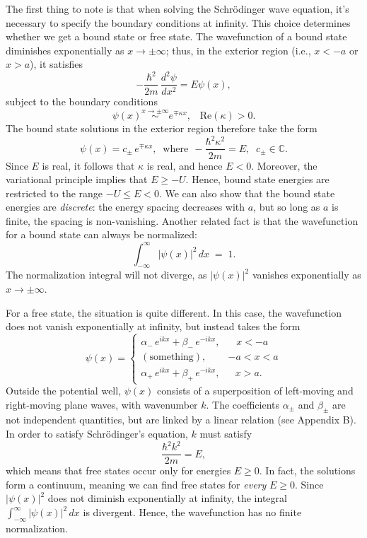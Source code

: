 \documentclass[pra,12pt]{revtex4}
\begin{document}
The first thing to note is that when solving the Schr\"odinger wave
equation, it's necessary to specify the boundary conditions at
infinity.  This choice determines whether we get a bound state or free
state.  The wavefunction of a bound state diminishes exponentially as
$x \rightarrow \pm\infty$; thus, in the exterior region (i.e., $x <
-a$ or $x > a$), it satisfies
$$-\frac{\hbar^2}{2m}\,\frac{d^2\psi}{dx^2} = E \psi(x),$$
subject to the boundary conditions
$$\psi(x) \overset{x\rightarrow\pm\infty}{\sim} e^{\mp\kappa x}, \;\;\;\mathrm{Re}(\kappa) > 0.$$
The bound state solutions in the exterior region therefore take the
form
$$\psi(x) = c_\pm\, e^{\mp\kappa x}, \;\;\mathrm{where}\;\, -\frac{\hbar^2\kappa^2}{2m} = E, \;\; c_\pm \in \mathbb{C}.$$
Since $E$ is real, it follows that $\kappa$ is real, and hence $E <
0$.  Moreover, the variational principle implies that $E \ge -U$.
Hence, bound state energies are restricted to the range $-U \le E <
0$.  We can also show that the bound state energies are
\textit{discrete}: the energy spacing decreases with $a$, but so long
as $a$ is finite, the spacing is non-vanishing.  Another related
fact is that the wavefunction for a bound state can always be
normalized:
$$\int_{-\infty}^\infty |\psi(x)|^2\, dx\; =\; 1.$$
The normalization integral will not diverge, as $|\psi(x)|^2$ vanishes
exponentially as $x \rightarrow \pm \infty$.

For a free state, the situation is quite different.  In this case, the
wavefunction does not vanish exponentially at infinity, but instead
takes the form
$$\psi(x) = \begin{cases} \alpha_-\, e^{ik x} + \beta_-\, e^{-ik x}, & \;\;\;x < -a\\ (\mathrm{something}) , & -a < x < a\\ \alpha_+\, e^{ik x} + \beta_+\, e^{-ik x} , & \;\;\,x > a.\end{cases}$$
Outside the potential well, $\psi(x)$ consists of a superposition of
left-moving and right-moving plane waves, with wavenumber $k$.  The
coefficients $\alpha_\pm$ and $\beta_\pm$ are not independent
quantities, but are linked by a linear relation (see Appendix B).  In
order to satisfy Schr\"odinger's equation, $k$ must satisfy
$$\frac{\hbar^2k^2}{2m} = E,$$
which means that free states occur only for energies $E \ge 0$.  In
fact, the solutions form a continuum, meaning we can find free states
for \textit{every} $E \ge 0$.  Since $|\psi(x)|^2$ does not diminish
exponentially at infinity, the integral $\int_{-\infty}^\infty
|\psi(x)|^2\, dx$ is divergent.  Hence, the wavefunction has no finite
normalization.
\end{document}
